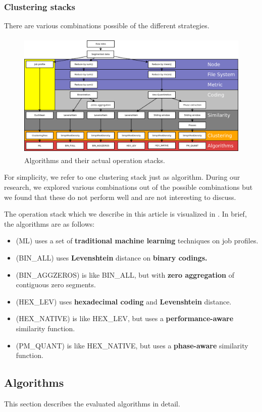 \documentclass[]{llncs}
\begin{document}
\subsubsection{Clustering stacks}
There are various combinations possible of the different strategies.

\begin{figure}
  \centering
  \includegraphics[width=4.61in,height=2.38in]{./media/image3.png}
  \caption{Algorithms and their actual operation stacks.}
  \label{fig:clustering_stacks}
\end{figure}

For simplicity, we refer to one clustering stack just as algorithm.
During our research, we explored various combinations out of the possible combinations but we found that these do not perform well and are not interesting to discuss.

The operation stack which we describe in this article is visualized in .
In brief, the algorithms are as follows:
\begin{itemize}
 \item (ML) uses a set of \textbf{traditional machine learning} techniques on job profiles.
 \item (BIN\_ALL) uses \textbf{Levenshtein} distance on \textbf{binary codings.}
 \item (BIN\_AGGZEROS) is like BIN\_ALL, but with \textbf{zero aggregation} of contiguous zero segments.
 \item (HEX\_LEV) uses \textbf{hexadecimal coding} and \textbf{Levenshtein} distance.
 \item (HEX\_NATIVE) is like HEX\_LEV, but uses a \textbf{performance-aware} similarity function.
 \item (PM\_QUANT) is like HEX\_NATIVE, but uses a \textbf{phase-aware} similarity function.
\end{itemize}

\subsection{Algorithms}
This section describes the evaluated algorithms in detail.
\end{document}
